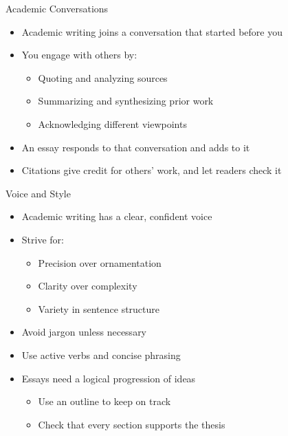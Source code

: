 \documentclass[aspectratio=169]{beamer}
\begin{document}
\begin{frame}{Academic Conversations}
\begin{itemize}
  \item Academic writing joins a conversation that started before you
  \item You engage with others by:
    \begin{itemize}
      \item Quoting and analyzing sources
      \item Summarizing and synthesizing prior work
      \item Acknowledging different viewpoints
    \end{itemize}
  \item An essay responds to that conversation and adds to it
  \item Citations give credit for others' work, and let readers check it
\end{itemize}
\end{frame}





\begin{frame}{Voice and Style}
\begin{itemize}
  \item Academic writing has a clear, confident voice
  \item Strive for:
    \begin{itemize}
      \item Precision over ornamentation
      \item Clarity over complexity
      \item Variety in sentence structure
    \end{itemize}
  \item Avoid jargon unless necessary
  \item Use active verbs and concise phrasing
  \item Essays need a logical progression of ideas
    \begin{itemize}
    \item Use an outline to keep on track
    \item Check that every section supports the thesis
    \end{itemize}
\end{itemize}
\end{frame}
\end{document}
